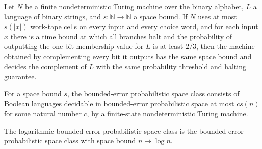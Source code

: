 \begin{theorem}
\label{Turing.FinNDTM.BPDecidesInSpace.flipOutput}
\leanok
{}
Let $N$ be a finite nondeterministic Turing machine over the binary alphabet, $L$ a
language of binary strings, and $s:\mathbb{N}\to\mathbb{N}$ a space bound. If $N$ uses
at most $s(|x|)$ work-tape cells on every input and every choice word, and for each
input $x$ there is a time bound at which all branches halt and the probability of
outputting the one-bit membership value for $L$ is at least $2/3$, then the machine
obtained by complementing every bit it outputs has the same space bound and decides the
complement of $L$ with the same probability threshold and halting guarantee.
\end{theorem}

\begin{definition}
\label{Randomized.BPSPACE}
\leanok
{}
For a space bound $s$, the bounded-error probabilistic space class consists of Boolean
languages decidable in bounded-error probabilistic space at most $c s(n)$ for some
natural number $c$, by a finite-state nondeterministic Turing machine.
\end{definition}

\begin{definition}
\label{Randomized.BPL}
\leanok
{}
The logarithmic bounded-error probabilistic space class is the bounded-error
probabilistic space class with space bound $n\mapsto \log n$.
\end{definition}


